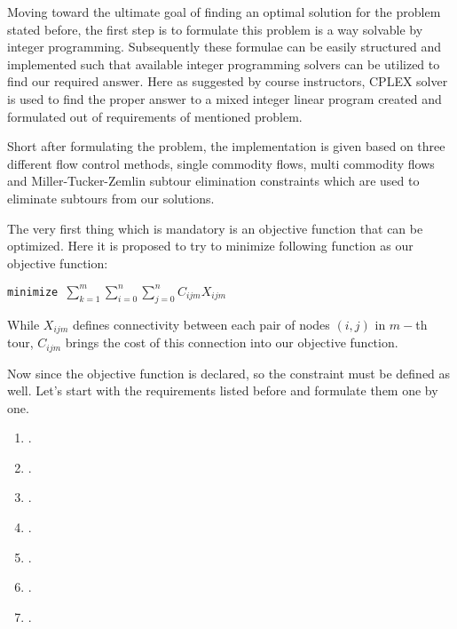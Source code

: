 Moving toward the ultimate goal of finding an optimal solution for the problem
stated before, the first step is to formulate this problem is a way solvable by
integer programming. Subsequently these formulae can be easily structured and
implemented such that available integer programming solvers can be utilized to
find our required answer. Here as suggested by course instructors, CPLEX solver
is used to find the proper answer to a mixed integer linear program created and
formulated out of requirements of mentioned problem.

Short after formulating the problem, the implementation is given based on three
different flow control methods, single commodity flows, multi commodity flows
and Miller-Tucker-Zemlin subtour elimination constraints which are used to
eliminate subtours from our solutions.

The very first thing which is mandatory is an objective function that can be
optimized. Here it is proposed to try to minimize following function as our
objective function:

\begin{center}

\texttt{minimize }$\sum_{k = 1}^{m} \sum_{i = 0}^{n} \sum_{j = 0}^{n}
C_{ijm} X_{ijm}$

\end{center}

While $X_{ijm}$ defines connectivity between each pair of nodes $(i,j)$ in
$m-$th tour, $C_{ijm}$ brings the cost of this connection into our objective
function.

Now since the objective function is declared, so the constraint must be defined
as well. Let's start with the requirements listed before and formulate them one
by one.

\begin{enumerate}
  \item .
  \item .
  \item .
  \item .
  \item .
  \item .
  \item .
\end{enumerate}
